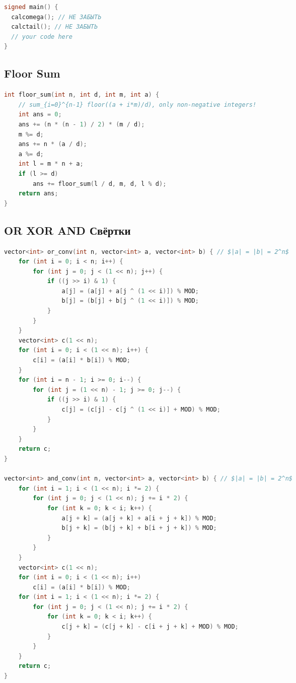 \documentclass[9pt,a4paper,landscape,twosided]{extarticle}
\begin{document}
\begin{multicols*}{3}
\begin{lstlisting}[language=C++]
signed main() {
  calcomega(); // НЕ ЗАБЫТЬ
  calctail(); // НЕ ЗАБЫТЬ
  // your code here
}

\end{lstlisting}

\subsection{Floor Sum}
\begin{lstlisting}[language=C++]
int floor_sum(int n, int d, int m, int a) {
    // sum_{i=0}^{n-1} floor((a + i*m)/d), only non-negative integers!
    int ans = 0;
    ans += (n * (n - 1) / 2) * (m / d);
    m %= d;
    ans += n * (a / d);
    a %= d;
    int l = m * n + a;
    if (l >= d)
        ans += floor_sum(l / d, m, d, l % d);
    return ans;
}
\end{lstlisting}

\subsection{OR XOR AND Свёртки}
\begin{lstlisting}[language=C++]
vector<int> or_conv(int n, vector<int> a, vector<int> b) { // $|a| = |b| = 2^n$
    for (int i = 0; i < n; i++) {
        for (int j = 0; j < (1 << n); j++) {
            if ((j >> i) & 1) {
                a[j] = (a[j] + a[j ^ (1 << i)]) % MOD;
                b[j] = (b[j] + b[j ^ (1 << i)]) % MOD;
            }
        }
    }
    vector<int> c(1 << n);
    for (int i = 0; i < (1 << n); i++) {
        c[i] = (a[i] * b[i]) % MOD;
    }
    for (int i = n - 1; i >= 0; i--) {
        for (int j = (1 << n) - 1; j >= 0; j--) {
            if ((j >> i) & 1) {
                c[j] = (c[j] - c[j ^ (1 << i)] + MOD) % MOD;
            }
        }
    }
    return c;
}

vector<int> and_conv(int n, vector<int> a, vector<int> b) { // $|a| = |b| = 2^n$
    for (int i = 1; i < (1 << n); i *= 2) {
        for (int j = 0; j < (1 << n); j += i * 2) {
            for (int k = 0; k < i; k++) {
                a[j + k] = (a[j + k] + a[i + j + k]) % MOD;
                b[j + k] = (b[j + k] + b[i + j + k]) % MOD;
            }
        }
    }
    vector<int> c(1 << n);
    for (int i = 0; i < (1 << n); i++)
        c[i] = (a[i] * b[i]) % MOD;
    for (int i = 1; i < (1 << n); i *= 2) {
        for (int j = 0; j < (1 << n); j += i * 2) {
            for (int k = 0; k < i; k++) {
                c[j + k] = (c[j + k] - c[i + j + k] + MOD) % MOD;
            }
        }
    }
    return c;
}


\end{lstlisting}
\end{multicols*}
\end{document}
